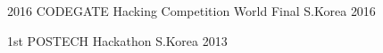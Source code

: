 

\begin{cvhonours}

	{2016 CODEGATE Hacking Competition World Final} %
	{S.Korea} %
	{2016} %

	{1st POSTECH Hackathon} %
	{S.Korea} %
	{2013} %

\end{cvhonours}
